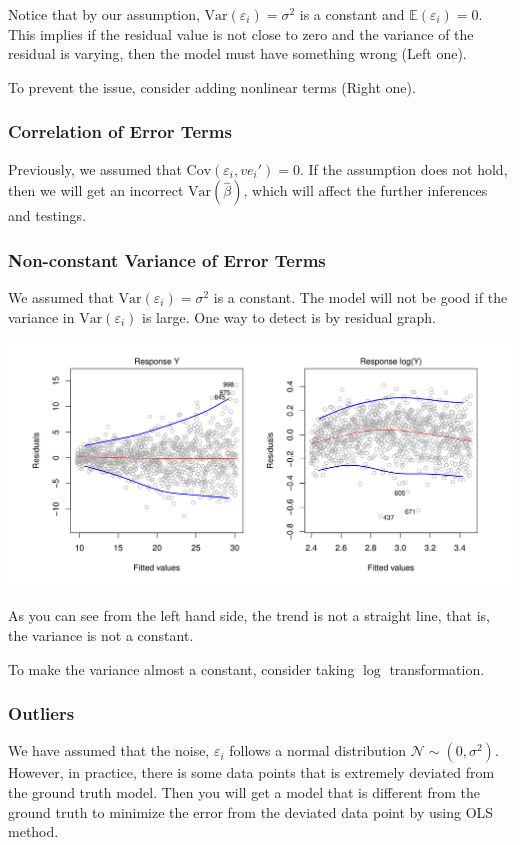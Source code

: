\documentclass{article}
\theoremstyle{MyNonumberplain}
\theoremstyle{break}
\newcommand{\ve}{\varepsilon}
\newcommand{\ev}{\mathbb{E}}
\newcommand{\var}{\text{Var}}
\newcommand{\cov}{\text{Cov}}
\theoremstyle{break}
\theoremstyle{break}
\theoremstyle{break}
\begin{document}
Notice that by our assumption, $\var(\ve_i)=\sigma^2$ is a constant and $\ev(\ve_i)=0$. 
This implies if the residual value is not close to zero and the variance of the residual is varying, then the model must have something wrong (Left one).

To prevent the issue, consider adding nonlinear terms (Right one).

\subsubsection{Correlation of Error Terms}

Previously, we assumed that $\cov(\ve_i,ve_i')=0$. 
If the assumption does not hold, then we will get an incorrect $\var(\hat\beta)$, which will affect the further inferences and testings.

\subsubsection{Non-constant Variance of Error Terms}

We assumed that $\var(\ve_i)=\sigma^2$ is a constant. The model will not be good if the variance in $\var(\ve_i)$ is large. 
One way to detect is by residual graph. 

\includegraphics[scale=0.2]{Images/img11.png}

As you can see from the left hand side, the trend is not a straight line, that is, the variance is not a constant.

To make the variance almost a constant, consider taking $\log$ transformation.

\subsubsection{Outliers}

We have assumed that the noise, $\ve_i$ follows a normal distribution $\mathcal{N}\sim (0,\sigma^2)$.
However, in practice, there is some data points that is extremely deviated from the ground truth model. 
Then you will get a model that is different from the ground truth to minimize the error from the deviated data point by using OLS method.
\end{document}
